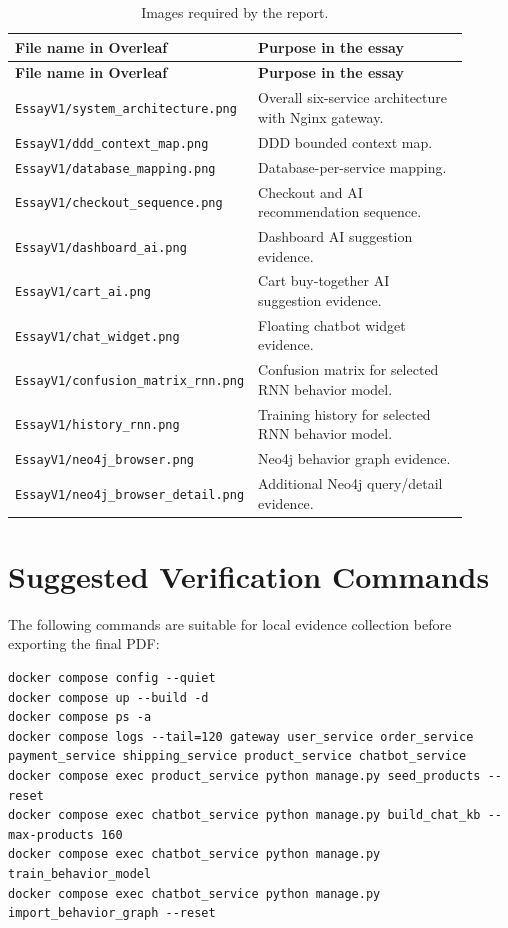 \documentclass[12pt,a4paper]{article}
\begin{document}
\begin{longtable}{p{0.34\linewidth}p{0.56\linewidth}}
\caption{Images required by the report.}
\label{tab:image-checklist}\\
\toprule
\textbf{File name in Overleaf} & \textbf{Purpose in the essay}\\
\midrule
\endfirsthead
\toprule
\textbf{File name in Overleaf} & \textbf{Purpose in the essay}\\
\midrule
\endhead
\texttt{EssayV1/system\_architecture.png} & Overall six-service architecture with Nginx gateway.\\
\texttt{EssayV1/ddd\_context\_map.png} & DDD bounded context map.\\
\texttt{EssayV1/database\_mapping.png} & Database-per-service mapping.\\
\texttt{EssayV1/checkout\_sequence.png} & Checkout and AI recommendation sequence.\\
\texttt{EssayV1/dashboard\_ai.png} & Dashboard AI suggestion evidence.\\
\texttt{EssayV1/cart\_ai.png} & Cart buy-together AI suggestion evidence.\\
\texttt{EssayV1/chat\_widget.png} & Floating chatbot widget evidence.\\
\texttt{EssayV1/confusion\_matrix\_rnn.png} & Confusion matrix for selected RNN behavior model.\\
\texttt{EssayV1/history\_rnn.png} & Training history for selected RNN behavior model.\\
\texttt{EssayV1/neo4j\_browser.png} & Neo4j behavior graph evidence.\\
\texttt{EssayV1/neo4j\_browser\_detail.png} & Additional Neo4j query/detail evidence.\\
\bottomrule
\end{longtable}

\section{Suggested Verification Commands}

The following commands are suitable for local evidence collection before exporting the final PDF:

\begin{lstlisting}
docker compose config --quiet
docker compose up --build -d
docker compose ps -a
docker compose logs --tail=120 gateway user_service order_service payment_service shipping_service product_service chatbot_service
docker compose exec product_service python manage.py seed_products --reset
docker compose exec chatbot_service python manage.py build_chat_kb --max-products 160
docker compose exec chatbot_service python manage.py train_behavior_model
docker compose exec chatbot_service python manage.py import_behavior_graph --reset
\end{lstlisting}
\end{document}
